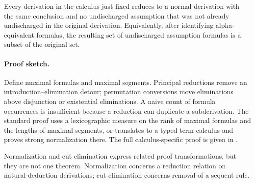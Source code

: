 \begin{theorem}
Every derivation in the calculus just fixed reduces to a normal derivation with
the same conclusion and no undischarged assumption that was not already
undischarged in the original derivation.  Equivalently, after identifying
alpha-equivalent formulas, the resulting set of undischarged assumption
formulas is a subset of the original set.
\end{theorem}

\paragraph{Proof sketch.}
Define maximal formulas and maximal segments.  Principal reductions remove an
introduction--elimination detour; permutation conversions move eliminations
above disjunction or existential eliminations.  A naive count of formula
occurrences is insufficient because a reduction can duplicate a
subderivation.  The standard proof uses a lexicographic measure on the rank
of maximal formulas and the lengths of maximal segments, or translates to a
typed term calculus and proves strong normalization there.  The full
calculus-specific proof is given in \cite{TroelstraSchwichtenberg2000}.

Normalization and cut elimination express related proof transformations, but
they are not one theorem.  Normalization concerns a reduction relation on
natural-deduction derivations; cut elimination concerns removal of a sequent
rule.

